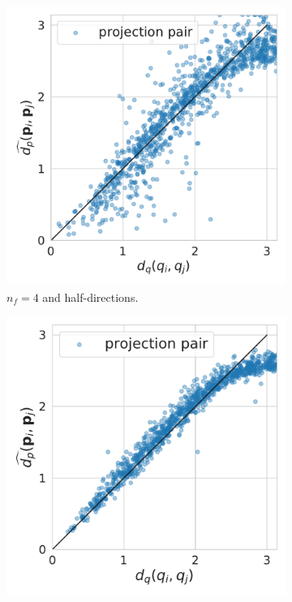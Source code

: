 \begin{figure}[ht!]
    \centering
    \centering
    \begin{minipage}[b]{0.8\linewidth}
        \begin{subfigure}[t]{0.31\linewidth}
            \includegraphics[width=\linewidth]{figures/dPdQ_5j0n_4d.pdf}
            \caption{$n_f=4$ and half-directions.}
        \end{subfigure}
        \hfill
        \begin{subfigure}[t]{0.31\linewidth}
            \includegraphics[width=\linewidth]{figures/dPdQ_5j0n_256.pdf}

\end{subfigure}
\end{minipage}
\end{figure}
